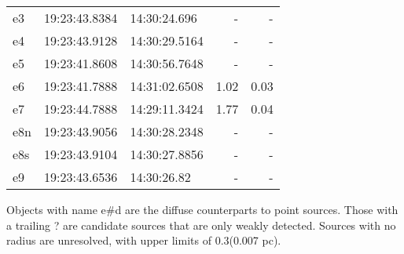 \begin{table*}[htp]
\begin{tabular}{lllrr}
e3 & 19:23:43.8384 & 14:30:24.696 & - & - \\
e4 & 19:23:43.9128 & 14:30:29.5164 & - & - \\
e5 & 19:23:41.8608 & 14:30:56.7648 & - & - \\
e6 & 19:23:41.7888 & 14:31:02.6508 & 1.02 & 0.03 \\
e7 & 19:23:44.7888 & 14:29:11.3424 & 1.77 & 0.04 \\
e8n & 19:23:43.9056 & 14:30:28.2348 & - & - \\
e8s & 19:23:43.9104 & 14:30:27.8856 & - & - \\
e9 & 19:23:43.6536 & 14:30:26.82 & - & - \\
\hline
\end{tabular}
\par
Objects with name e\#d are the diffuse counterparts to point sources.  Those with a trailing ? are candidate sources that are only weakly detected.   Sources with no radius are unresolved, with upper limits of 0.3\arcsec (0.007 pc).
\end{table*}
